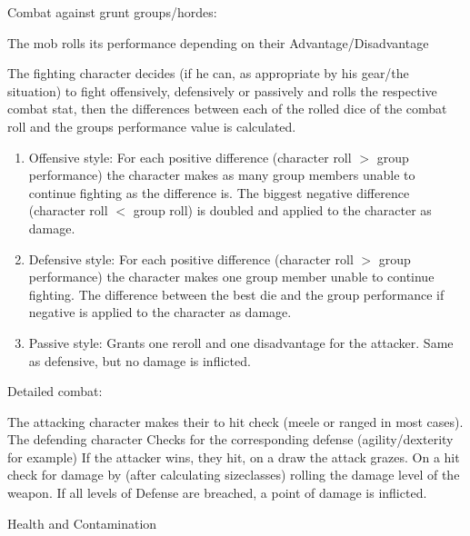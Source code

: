 \documentclass{article}
\newcommand{\subhline}[1]{\begin{center}\large #1 \normalsize \end{center}}
\begin{document}
    Combat against grunt groups/hordes:\par
    The mob rolls its performance depending on their Advantage/Disadvantage\par
    The fighting character decides (if he can, as appropriate by his gear/the situation) to fight offensively, defensively
    or passively and rolls the respective combat stat, then the differences between each of the rolled dice of the combat
    roll and the groups performance value is calculated.\par
    \begin{enumerate}[label= - ]

        \item  Offensive style: For each positive difference (character roll \(>\) group performance) the character makes as
        many group members unable to continue fighting as the difference is. The biggest negative difference (character roll
        \(<\) group roll) is doubled and applied to the character as damage.\\

        \item Defensive style: For each positive difference (character roll \(>\) group performance) the character makes one
        group member unable to continue fighting. The difference between the best die and the group performance if negative
        is applied to the character as damage.\\

        \item Passive style: Grants one reroll and one disadvantage for the attacker. Same as defensive, but no damage is
        inflicted.
    \end{enumerate}

    Detailed combat:\par
    The attacking character makes their to hit check (meele or ranged in most cases). The defending character Checks for the
    corresponding defense (agility/dexterity for example) If the attacker wins, they hit, on a draw the
    attack grazes. On a hit check for damage by (after calculating sizeclasses) rolling the damage level of the weapon.
    If all levels of Defense are breached, a point of damage is inflicted.
    \newline
    \pagebreak[1]
    \subhline{Health and Contamination}
\end{document}
